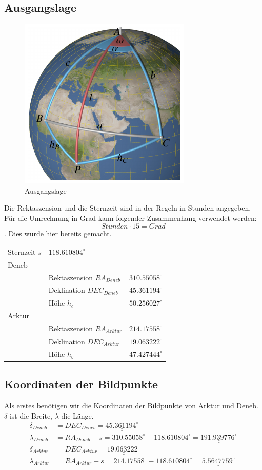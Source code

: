 \subsection{Ausgangslage}
\begin{figure}
	\includegraphics{papers/nav/bilder/position1.pdf}
	\caption{Ausgangslage}
\end{figure}
Die Rektaszension und die Sternzeit sind in der Regeln in Stunden angegeben.
Für die Umrechnung in Grad kann folgender Zusammenhang verwendet werden:
\[ Stunden \cdot 15 = Grad\].
Dies wurde hier bereits gemacht.
\begin{center}
	\begin{tabular}{l l l}
		Sternzeit $s$ & $118.610804^\circ$ \\
		Deneb&\\
		& Rektaszension $RA_{Deneb}$& $310.55058^\circ$ \\
		& Deklination $DEC_{Deneb}$& $45.361194^\circ$ \\
		& Höhe $h_c$ & $50.256027^\circ$ \\ 
		Arktur &\\
		& Rektaszension $RA_{Arktur}$& $214.17558^\circ$ \\
		& Deklination $DEC_{Arktur}$& $19.063222^\circ$ \\
		& Höhe $h_b$ & $47.427444^\circ$ \\  
	\end{tabular}
\end{center}
\subsection{Koordinaten der Bildpunkte}
Als erstes benötigen wir die Koordinaten der Bildpunkte von Arktur und Deneb. 
$\delta$ ist die Breite, $\lambda$ die Länge.
\begin{align}
\delta_{Deneb}&=DEC_{Deneb} = \underline{\underline{45.361194^\circ}} \nonumber \\ 
\lambda_{Deneb}&=RA_{Deneb} - s = 310.55058^\circ -118.610804^\circ =\underline{\underline{191.939776^\circ}}   \nonumber \\ 
\delta_{Arktur}&=DEC_{Arktur} =  \underline{\underline{19.063222^\circ}} \nonumber \\ 
\lambda_{Arktur}&=RA_{Arktur} - s = 214.17558^\circ -118.610804^\circ = \underline{\underline{5.5647759^\circ}}  \nonumber  
\end{align}


